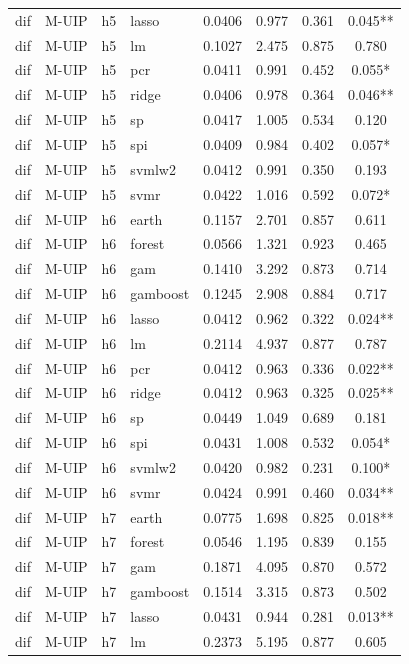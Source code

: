 \begin{ThreePartTable}
\begin{longtable}[t]{llclcccc}
dif & M-UIP & h5 & lasso & 0.0406 & 0.977 & 0.361 & 0.045**\\
dif & M-UIP & h5 & lm & 0.1027 & 2.475 & 0.875 & 0.780\\
dif & M-UIP & h5 & pcr & 0.0411 & 0.991 & 0.452 & 0.055*\\
dif & M-UIP & h5 & ridge & 0.0406 & 0.978 & 0.364 & 0.046**\\
dif & M-UIP & h5 & sp & 0.0417 & 1.005 & 0.534 & 0.120\\
dif & M-UIP & h5 & spi & 0.0409 & 0.984 & 0.402 & 0.057*\\
dif & M-UIP & h5 & svmlw2 & 0.0412 & 0.991 & 0.350 & 0.193\\
dif & M-UIP & h5 & svmr & 0.0422 & 1.016 & 0.592 & 0.072*\\
\addlinespace
dif & M-UIP & h6 & earth & 0.1157 & 2.701 & 0.857 & 0.611\\
dif & M-UIP & h6 & forest & 0.0566 & 1.321 & 0.923 & 0.465\\
dif & M-UIP & h6 & gam & 0.1410 & 3.292 & 0.873 & 0.714\\
dif & M-UIP & h6 & gamboost & 0.1245 & 2.908 & 0.884 & 0.717\\
dif & M-UIP & h6 & lasso & 0.0412 & 0.962 & 0.322 & 0.024**\\
dif & M-UIP & h6 & lm & 0.2114 & 4.937 & 0.877 & 0.787\\
dif & M-UIP & h6 & pcr & 0.0412 & 0.963 & 0.336 & 0.022**\\
dif & M-UIP & h6 & ridge & 0.0412 & 0.963 & 0.325 & 0.025**\\
dif & M-UIP & h6 & sp & 0.0449 & 1.049 & 0.689 & 0.181\\
dif & M-UIP & h6 & spi & 0.0431 & 1.008 & 0.532 & 0.054*\\
dif & M-UIP & h6 & svmlw2 & 0.0420 & 0.982 & 0.231 & 0.100*\\
dif & M-UIP & h6 & svmr & 0.0424 & 0.991 & 0.460 & 0.034**\\
\addlinespace
dif & M-UIP & h7 & earth & 0.0775 & 1.698 & 0.825 & 0.018**\\
dif & M-UIP & h7 & forest & 0.0546 & 1.195 & 0.839 & 0.155\\
dif & M-UIP & h7 & gam & 0.1871 & 4.095 & 0.870 & 0.572\\
dif & M-UIP & h7 & gamboost & 0.1514 & 3.315 & 0.873 & 0.502\\
dif & M-UIP & h7 & lasso & 0.0431 & 0.944 & 0.281 & 0.013**\\
dif & M-UIP & h7 & lm & 0.2373 & 5.195 & 0.877 & 0.605\\

\end{longtable}
\end{ThreePartTable}
